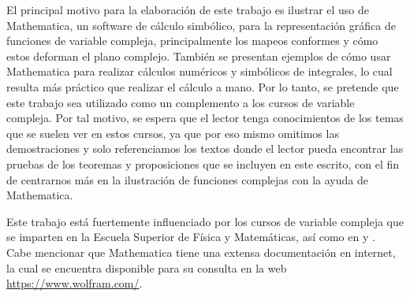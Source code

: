 \documentclass[letterpaper,12pt,openany]{book}
\theoremstyle{definition}
\theoremstyle{definition}
\theoremstyle{definition}
\theoremstyle{definition}
\theoremstyle{definition}
\theoremstyle{remark}
\theoremstyle{definition}
\begin{document}
	El principal motivo para la elaboración de este trabajo es ilustrar el uso de Mathematica, un software de cálculo simbólico, para la representación gráfica de funciones de variable compleja, principalmente los mapeos conformes y cómo estos deforman el plano complejo. También se presentan ejemplos de cómo usar Mathematica para realizar cálculos numéricos y simbólicos de integrales, lo cual resulta más práctico que realizar el cálculo a mano. Por lo tanto, se pretende que este trabajo sea utilizado como un complemento a los cursos de variable compleja. Por tal motivo, se espera que el lector tenga conocimientos de los temas que se suelen ver en estos cursos, ya que por eso mismo omitimos las demostraciones y solo referenciamos los textos donde el lector pueda encontrar las pruebas de los teoremas y proposiciones que se incluyen en este escrito, con el fin de centrarnos más en la ilustración de funciones complejas con la ayuda de Mathematica.
	
	Este trabajo está fuertemente influenciado por los cursos de variable compleja que se imparten en la Escuela Superior de Física y Matemáticas, así como en \cite{shaw} y \cite{silverman}. Cabe mencionar que Mathematica tiene una extensa documentación en internet, la cual se encuentra disponible para su consulta en la web \url{https://www.wolfram.com/}.
	\mainmatter
	
	
	
	
	
	
	
	
	
	
	
%	
	
	\nocite{tarlok}
	\nocite{silverman}
	\nocite{shaw}
	\nocite{ComplexRegionPlot}
	\nocite{marsden}
	\nocite{Churchill}
	\nocite{ahlfors}
	\nocite{rajeev}
	\nocite{Driscoll}
	\nocite{Abramowitz}
	\nocite{Beta}
	\nocite{BetaInc}
	\nocite{Pearson}
	\nocite{BetaR}
	\nocite{Conway}
	\nocite{Elliptic}
	\nocite{Hypergeometric2F1}
	\nocite{ComplexPlot}
	\nocite{ComplexPlot3D}
	\nocite{ComplexContourPlot}
	\nocite{Shaw-A}
	\nocite{GeometryJo}
	\nocite{ComplexVector}
	\nocite{Domain_coloring}
	
\end{document}
